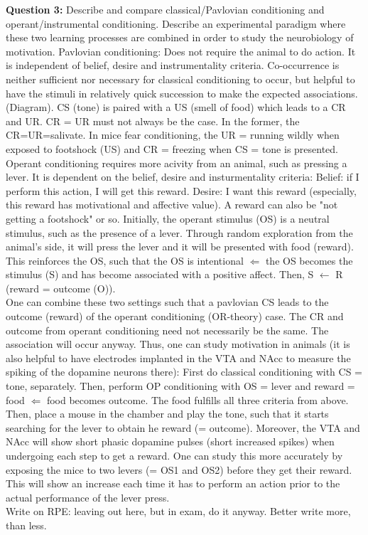 \documentclass[twosided, a4paper, pt11]{article}
\begin{document}
	\textbf{Question 3:} Describe and compare classical/Pavlovian conditioning and operant/instrumental conditioning. Describe an experimental paradigm where these two learning processes are combined in order to study the neurobiology of motivation.\newline
	Pavlovian conditioning: Does not require the animal to do action. It is independent of belief, desire and instrumentality criteria. Co-occurrence is neither sufficient nor necessary for classical conditioning to occur, but helpful to have the stimuli in relatively quick succession to make the expected associations. (Diagram). CS (tone) is paired with a US (smell of food) which leads to a CR and UR. CR = UR must not always be the case. In the former, the CR=UR=salivate. In mice fear conditioning, the UR = running wildly when exposed to footshock (US) and CR = freezing when CS = tone is presented.\\
	Operant conditioning requires more acivity from an animal, such as pressing a lever. It is dependent on the belief, desire and insturmentality criteria: Belief: if I perform this action, I will get this reward. Desire: I want this reward (especially, this reward has motivational and affective value). A reward can also be "not getting a footshock" or so. Initially, the operant stimulus (OS) is a neutral stimulus, such as the presence of a lever. Through random exploration from the animal's side, it will press the lever and it will be presented with food (reward). This reinforces the OS, such that the OS is intentional $\Leftarrow$ the OS becomes the stimulus (S) and has become associated with a positive affect. Then, S $\leftarrow$ R (reward = outcome (O)).\\
	One can combine these two settings such that a pavlovian CS leads to the outcome (reward) of the operant conditioning (OR-theory) case. The CR and outcome from operant conditioning need not necessarily be the same. The association will occur anyway. Thus, one can study motivation in animals (it is also helpful to have electrodes implanted in the VTA and NAcc to measure the spiking of the dopamine neurons there): First do classical conditioning with CS = tone, separately. Then, perform OP conditioning with OS = lever and reward = food $\Leftarrow$ food becomes outcome. The food fulfills all three criteria from above. Then, place a mouse in the chamber and play the tone, such that it starts searching for the lever to obtain he reward (= outcome). Moreover, the VTA and NAcc will show short phasic dopamine pulses (short increased spikes) when undergoing each step to get a reward. One can study this more accurately by exposing the mice to two levers (= OS1 and OS2) before they get their reward. This will show an increase each time it has to perform an action prior to the actual performance of the lever press.\\
	Write on RPE: leaving out here, but in exam, do it anyway. Better write more, than less.\newline
	
\end{document}
